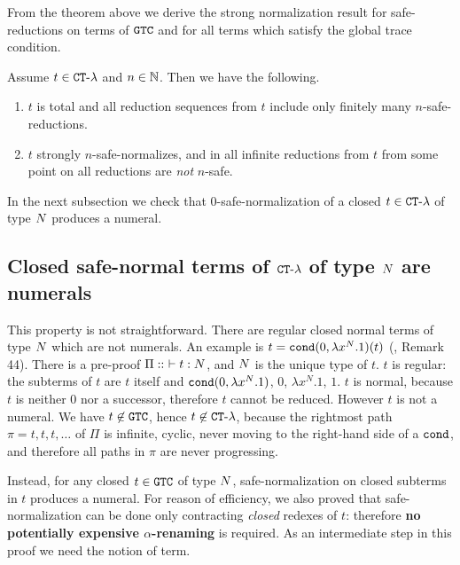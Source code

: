 

From the theorem above we derive the strong normalization result 
for safe-reductions on terms of ${\tt GTC}$
and for all terms which satisfy the global trace condition.

\begin{corollary}\label{cor:SN_GTC}
\label{corollary-finite-safe-reduction}
  Assume  $t \in { {\tt CT}\mbox{-}\lambda}$ and $n \in \mathbb{N}$. Then we have the following. 
  \begin {enumerate}
  \item
    $t$ is total and all reduction sequences
    from $t$ include only finitely many $n$-safe-reductions.
  \item
    $t$ strongly $n$-safe-normalizes, and in all infinite reductions from $t$
    from some point on all reductions are \emph{not} $n$-safe.
   \end{enumerate}

\end{corollary}

In the next subsection we check that $0$-safe-normalization of a closed $t \in { {\tt CT}\mbox{-}\lambda}$
of type ${N}$ produces a numeral.


\subsection{Closed safe-normal terms of ${ {\tt CT}\mbox{-}\lambda}$ of type ${N}$ are numerals}
This property is not straightforward. 
There are regular closed normal terms of type ${N}$ which are not numerals.
An example is $t = {\tt cond}(0, \lambda x^N.1)(t)$ 
(\cite{2021-Anupam-Das}, Remark 44). 
There is a pre-proof $\Pi::\ \vdash t: {N}$, and ${N}$ is the unique type of $t$. 
$t$ is regular: the subterms of $t$ are
$t$ itself and ${\tt cond}(0, \lambda x^N.1)$, $0$, $\lambda x^N.1$, $1$.
$t$ is normal, because $t$ is neither $0$ nor a successor, 
therefore $t$ cannot be reduced. However $t$ is not a numeral.
We have $t \not \in {\tt GTC}$, hence $t \not \in { {\tt CT}\mbox{-}\lambda}$, because
the rightmost path $\pi = t,t,t,\ldots$ of $\Pi$ is infinite, cyclic, 
never moving to the right-hand side of a ${\tt cond}$,
and therefore all paths in $\pi$ are never progressing.

Instead, for any closed $t \in {\tt GTC}$ of type ${N}$, safe-normalization on closed subterms in $t$
produces a numeral. For reason of efficiency,
we also proved that safe-normalization can be done only contracting 
\emph{closed} redexes of $t$: therefore 
{\bf no potentially expensive $\alpha$-renaming} is required.
As an intermediate step in this proof we need the notion of 
 term.

